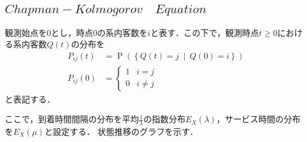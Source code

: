 \documentclass[a4j,papersize,disablejfam,slide,14pt]{jsarticle}
\def\cprob#1#2{\operatorname{P} \left(\left\{ #1 \ \middle|\ #2 \right\}\right)} %
\begin{document}
\subsection{$Chapman-Kolmogorov\quad Equation$}
    観測始点を$0$とし，時点$0$の系内客数を$i$と表す．この下で，観測時点$t \geq 0$における系内客数$Q(t)$の分布を
    \begin{align}
    	P_{ij}(t) &= \cprob{Q(t) = j}{Q(0) = i} \\
        P_{ij}(0) &= 
        \begin{cases}
        	1 & \text{$i = j$} \\
            0 & \text{$i \neq j$}
        \end{cases}
    \end{align}
    と表記する．

	ここで，到着時間間隔の分布を平均$\frac{1}{\lambda}$の指数分布$E_X(\lambda)$，サービス時間の分布を$E_X(\mu)$と設定する．
    状態推移のグラフを示す．
\end{document}
